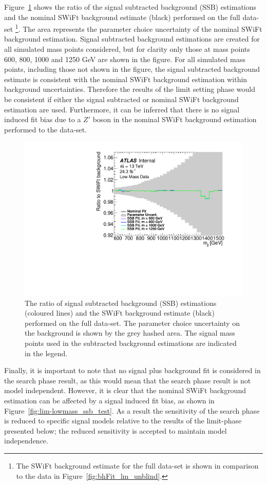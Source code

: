 Figure~\ref{fig:lim-lowmass_ssb_data} shows the ratio of the 
signal subtracted background (SSB) estimations and the nominal SWiFt background estimate (black) performed on the full \lm{} data-set
\footnote{The SWiFt background estimate for the full data-set is shown in comparison to the data in Figure~\ref{fig:bhFit_lm_unblind}.}.
The area represents the parameter choice uncertainty of the nominal SWiFt background estimation.
Signal subtracted background estimations are created for all simulated mass points considered,
but for clarity only those at mass points 600, 800, 1000 and 1250 GeV are shown in the figure.
For all simulated mass points, including those not shown in the figure,
the signal subtracted background estimate is consistent with the nominal SWiFt background estimation
within background uncertainties.
Therefore the results of the limit setting phase would be consistent if either the
signal subtracted or nominal SWiFt background estimation are used.
Furthermore, it can be inferred that there is no signal induced fit bias due to a $Z'$ boson
in the nominal SWiFt background estimation performed to the \lm{} data-set.

\begin{figure}[!ht]
  \begin{center}
    \includegraphics[width=0.6\linewidth, angle=0]{figs/Dibjet/LowMass/lim-ssb_data.pdf}
  \end{center}
  \vspace{-1mm}
  \caption{The ratio of signal subtracted background (SSB) estimations (coloured lines)
    and the SWiFt background estimate (black) performed on the full \lm{} data-set.
    The parameter choice uncertainty on the background is shown by the grey hashed area.
    The signal mass points used in the subtracted background estimations are indicated in the legend.}
  \label{fig:lim-lowmass_ssb_data}
\end{figure}

Finally, it is important to note that no signal plus background fit is considered in the search phase result,
as this would mean that the search phase result is not model independent.
However, it is clear that the nominal SWiFt background estimation can be affected by a signal induced fit bias,
as shown in Figure~\ref{fig:lim-lowmass_ssb_test}.
As a result the sensitivity of the search phase is reduced to specific signal models relative to the results of the limit-phase presented below;
the reduced sensitivity is accepted to maintain model independence.

